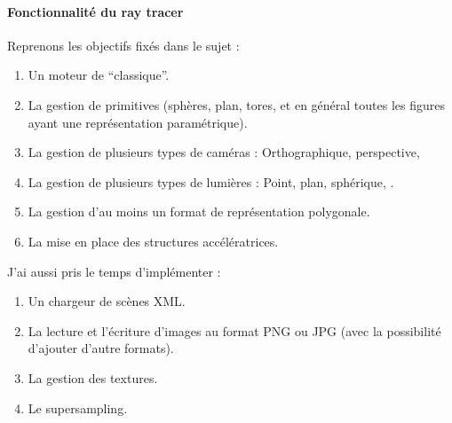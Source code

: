 \paragraph{Fonctionnalité du ray tracer}
Reprenons les objectifs fixés dans le sujet :
\begin{enumerate}
  \item Un moteur de \raytracing ``classique''.\textcolor[rgb]{0.0, 0.9, 0.2}{\checkmark}
  \item La gestion de primitives (sphères, plan, tores, et en général toutes
    les figures ayant une représentation paramétrique).\textcolor[rgb]{0.0, 0.9, 0.2}{\checkmark}
  \item La gestion de plusieurs types de caméras : Orthographique,
    perspective, \etc\textcolor[rgb]{0.0, 0.9, 0.2}{\checkmark}
  \item La gestion de plusieurs types de lumières : Point, plan, sphérique,
    \etc.\textcolor[rgb]{0.0, 0.9, 0.2}{\checkmark}
  \item La gestion d'au moins un format de représentation polygonale.\textcolor[rgb]{0.0, 0.9, 0.2}{\checkmark}
  \item La mise en place des structures accélératrices.\textcolor[rgb]{0.0, 0.9, 0.2}{\checkmark}
\end{enumerate}

\newpar J'ai aussi pris le temps d'implémenter :
\begin{enumerate}
  \item Un chargeur de scènes XML.
  \item La lecture et l'écriture d'images au format PNG ou JPG (avec la
  possibilité d'ajouter d'autre formats).
  \item La gestion des textures.
  \item Le \gls{supersampling}.
\end{enumerate}


